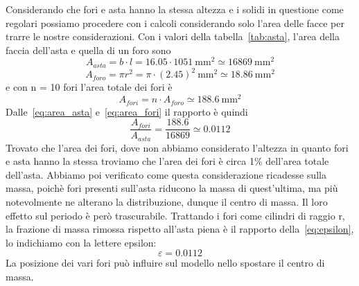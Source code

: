 \documentclass[a4paper]{article}
\begin{document}
 Considerando che fori e asta hanno la stessa altezza e i solidi in questione come regolari possiamo procedere con i calcoli considerando solo l'area delle facce per trarre le nostre considerazioni.
 Con i valori della tabella~\ref{tab:asta}, l'area della faccia dell'asta e quella di un foro sono
\begin{equation}
    A_{asta} = b \cdot l = 16.05 \cdot 1051\ \text{mm}^2 \simeq 16869\ \text{mm}^2
    \label{eq:area_asta}
\end{equation}
\begin{equation}
    A_{foro} = \pi r^2 = \pi \cdot (2.45)^2\ \text{mm}^2 \simeq 18.86\ \text{mm}^2
    \label{eq:area_foro}
\end{equation}
e con n = 10 fori l'area totale dei fori è
\begin{equation}
    A_{fori} = n \cdot A_{foro} \simeq 188.6\ \text{mm}^2
    \label{eq:area_fori}
\end{equation}
Dalle~\eqref{eq:area_asta} e~\eqref{eq:area_fori} il rapporto è quindi
\begin{equation}
    \frac{A_{fori}}{A_{asta}} = \frac{188.6}{16869} \simeq 0.0112
    \label{eq:rapporto_aree}
\end{equation}
 Trovato che l'area dei fori, dove non abbiamo considerato l'altezza in quanto fori e asta hanno la stessa troviamo che l'area dei fori è circa 1\% dell'area totale dell'asta. \newline Abbiamo poi verificato come questa considerazione ricadesse sulla massa, poichè fori presenti sull’asta riducono la massa di quest'ultima, ma più notevolmente ne alterano la distribuzione, dunque il centro di massa.
 Il loro effetto sul periodo è però trascurabile. Trattando i fori come cilindri di raggio r, la frazione di massa rimossa rispetto all’asta piena è il rapporto della~\eqref{eq:epsilon}, lo indichiamo con la lettere epsilon:
\begin{equation}
    \varepsilon = 0.0112
    \label{eq:epsilon}
\end{equation}
La posizione dei vari fori può influire sul modello nello spostare il centro di massa.
\end{document}
